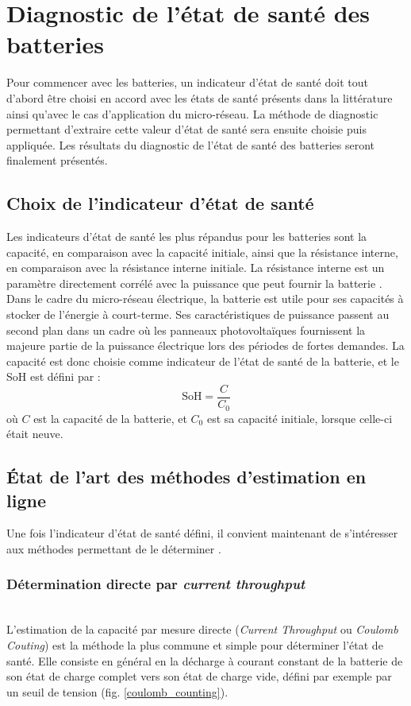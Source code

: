 \section{Diagnostic de l'état de santé des batteries}
Pour commencer avec les batteries, un indicateur d'état de santé doit tout d'abord être choisi en accord avec les états de santé présents dans la littérature ainsi qu'avec le cas d'application du micro-réseau. La méthode de diagnostic permettant d'extraire cette valeur d'état de santé sera ensuite choisie puis appliquée. Les résultats du diagnostic de l'état de santé des batteries seront finalement présentés.
\subsection{Choix de l'indicateur d'état de santé}
Les indicateurs d'état de santé les plus répandus pour les batteries sont la capacité, en comparaison avec la capacité initiale, ainsi que la résistance interne, en comparaison avec la résistance interne initiale. La résistance interne est un paramètre directement corrélé avec la puissance que peut fournir la batterie \cite{noura_review_2020}. Dans le cadre du micro-réseau électrique, la batterie est utile pour ses capacités à stocker de l'énergie à court-terme. Ses caractéristiques de puissance passent au second plan dans un cadre où les panneaux photovoltaïques fournissent la majeure partie de la puissance électrique lors des périodes de fortes demandes. La capacité est donc choisie comme indicateur de l'état de santé de la batterie, et le SoH est défini par : 
\begin{equation}
    \mathrm{SoH} = \frac{C}{C_0}
    \label{soh_bat}
\end{equation}
où $C$ est la capacité de la batterie, et $C_0$ est sa capacité initiale, lorsque celle-ci était neuve.


\subsection{État de l'art des méthodes d'estimation en ligne}
Une fois l'indicateur d'état de santé défini, il convient maintenant de s'intéresser aux méthodes permettant de le déterminer \cite{peng_review_2022}. 

\subsubsection{Détermination directe par \textit{current throughput}}\hfill \\
L'estimation de la capacité par mesure directe (\textit{Current Throughput} ou \textit{Coulomb Couting}) est la méthode la plus commune et simple pour déterminer l'état de santé. Elle consiste en général en la décharge à courant constant de la batterie de son état de charge complet vers son état de charge vide, défini par exemple par un seuil de tension (fig. \ref{coulomb_counting}).

